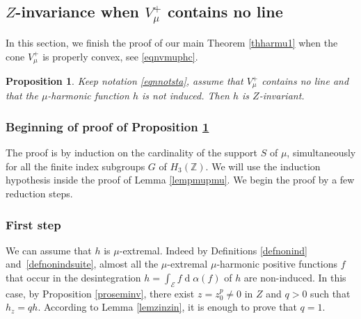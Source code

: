 \documentclass[11pt]{article}
\numberwithin{equation}{section}
\let\mathcal\mathscr
\DeclareMathOperator{\rd}{d}
\newtheorem{Prop}[Thm]{Proposition}
\theoremstyle{definition}
\newcommand{\m}[1]{\mathbb{ #1}}
\newcommand{\mc}[1]{\mathcal{ #1}}
\let\al\alpha
\let\bq\relax
\let\eq\relax
\begin{document}
\subsection{$Z$-invariance when $V^+_\mu$ contains no line}
\label{secvmunol}

\bq
In this section, we finish the proof of our main Theorem
\ref{thharmu1}
when the cone $V_\mu^+$ is properly convex, see \eqref{eqnvmuphc}.
\eq

\begin{Prop}

\label{provmunol}
Keep notation \eqref{eqnnotsta}, assume that
$V^+_\mu$ contains no line
and that the $\mu$-harmonic function $h$ is not induced.
Then $h$ is $Z$-invariant.
\end{Prop}

\subsubsection*{Beginning of proof of Proposition \ref{provmunol}}
The proof is by induction on the cardinality of the support $S$ of $\mu$,
simultaneously for all the finite index subgroups $G$ of $H_3(\m Z)$.
We will use the induction hypothesis inside the proof of Lemma \ref{lempmupmu}. We begin the proof by a few reduction steps.

\subsubsection*{First step}
We can assume that $h$ is $\mu$-extremal.
Indeed by Definitions \ref{defnonind} and~\ref{defnonindsuite},
almost all the $\mu$-extremal $\mu$-harmonic positive functions $f$
that occur in the desintegration $h=\int_{\mc E}f\rd \al (f)$ of $h$
are non-induced.
In this case,
by Proposition \ref{proseminv}, there exist $z=z_0^p\neq 0$ in $Z$ and $q>0$
such that $h_z=qh$.
According to Lemma \ref{lemzinzin}, it is enough to prove that $q=1$.
\end{document}
